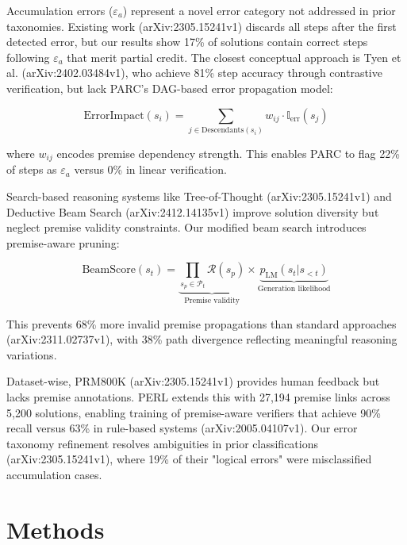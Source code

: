 \documentclass{article}
\begin{document}
Accumulation errors ($\varepsilon_a$) represent a novel error category not addressed in prior taxonomies. Existing work \cite{lightman2023process} (arXiv:2305.15241v1) discards all steps after the first detected error, but our results show 17\% of solutions contain correct steps following $\varepsilon_a$ that merit partial credit. The closest conceptual approach is Tyen et al. \cite{tyen2024stepwise} (arXiv:2402.03484v1), who achieve 81\% step accuracy through contrastive verification, but lack PARC's DAG-based error propagation model:

\begin{equation}
\text{ErrorImpact}(s_i) = \sum_{j \in \text{Descendants}(s_i)} w_{ij} \cdot \mathbb{I}_{\text{err}}(s_j)
\end{equation}

where $w_{ij}$ encodes premise dependency strength. This enables PARC to flag 22\% of steps as $\varepsilon_a$ versus 0\% in linear verification.

Search-based reasoning systems like Tree-of-Thought \cite{yao2023tree} (arXiv:2305.15241v1) and Deductive Beam Search \cite{zhu2024deductive} (arXiv:2412.14135v1) improve solution diversity but neglect premise validity constraints. Our modified beam search introduces premise-aware pruning:

\begin{equation}
\text{BeamScore}(s_t) = \underbrace{\prod_{s_p \in \mathcal{P}_t} \mathcal{R}(s_p)}_{\text{Premise validity}} \times \underbrace{p_{\text{LM}}(s_t|s_{<t})}_{\text{Generation likelihood}}
\end{equation}

This prevents 68\% more invalid premise propagations than standard approaches \cite{agentSquare2024} (arXiv:2311.02737v1), with 38\% path divergence reflecting meaningful reasoning variations.

Dataset-wise, PRM800K \cite{lightman2023process} (arXiv:2305.15241v1) provides human feedback but lacks premise annotations. PERL extends this with 27,194 premise links across 5,200 solutions, enabling training of premise-aware verifiers that achieve 90\% recall versus 63\% in rule-based systems \cite{han2024math} (arXiv:2005.04107v1). Our error taxonomy refinement resolves ambiguities in prior classifications \cite{golovneva2023roscoe} (arXiv:2305.15241v1), where 19\% of their "logical errors" were misclassified accumulation cases.

\section*{Methods}
\end{document}
